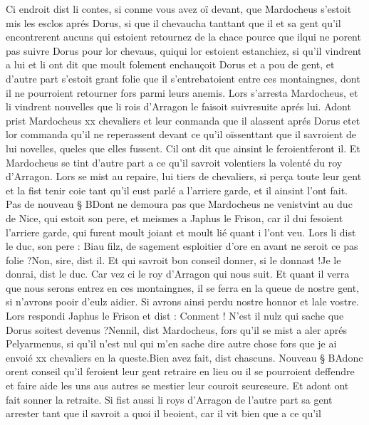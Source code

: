 \documentclass{article}
\begin{document}
\begin{pages}
\pstart Ci endroit dist li contes, si conme vous avez oï devant, que 
   Mardocheus s’estoit mis les esclos aprés Dorus, 
   si que il chevaucha tanttant que il et sa gent qu’il encontrerent aucuns 
   qui estoient retournez de la chace pource que ilqui ne porent pas suivre 
   Dorus pour lor chevaus, quiqui lor 
   estoient estanchiez, si qu’il vindrent a lui et li ont dit que 
   moult folement enchauçoit Dorus et a pou de gent, 
      et d’autre part s’estoit grant folie que il s’entrebatoient entre ces montaingnes, 
      dont il ne pourroient retourner fors parmi leurs anemis. 
   Lors s’arresta Mardocheus, et li vindrent nouvelles que 
   li rois d’Arragon 
   le faisoit suivresuite 
   aprés lui. Adont prist Mardocheus xx chevaliers et leur conmanda que 
   il alassent aprés Dorus 
      etet lor commanda qu’il ne reperassent 
      devant ce qu’il oïssenttant que il savroient de lui novelles, queles 
      que elles fussent. Cil ont dit que ainsint le 
         feroientferont il. Et 
   Mardocheus se tint d’autre part a ce 
   qu’il savroit volentiers la volenté du 
   roy d’Arragon. Lors se mist au repaire, lui 
   tiers de chevaliers, si perça toute leur gent et la fist tenir coie tant qu’il 
   eust parlé a l’arriere garde, et il ainsint l’ont fait. \pend
\pstart Pas de nouveau § BDont ne demoura pas que 
   Mardocheus ne 
   venistvint au 
   duc de Nice, qui estoit son pere, et meismes a 
   Japhus le Frison, car il dui fesoient l’arriere garde, qui furent moult 
   joiant et moult lié quant i l’ont veu. Lors li dist 
   le duc, son pere :
   Biau filz, de sagement esploitier d’ore en avant ne seroit 
      ce pas folie ?Non, sire, dist il. Et qui savroit bon conseil donner, si le donnast !Je le donrai, dist le duc. 
   Car vez ci le roy d’Arragon qui nous suit. 
   Et quant il verra que nous serons entrez en ces montaingnes, il se ferra en la queue de nostre gent, si n’avrons pooir d’eulz aidier. 
   Si avrons ainsi perdu nostre honnor et lale vostre.
   Lors respondi Japhus le Frison et dist :
   Conment ! N’est il nulz qui sache que Dorus 
      soitest devenus ?Nennil, dist Mardocheus, 
   fors qu’il se mist a aler aprés Pelyarmenus, si qu’il n’est nul qui m’en sache dire autre chose 
   fors que je ai envoié xx chevaliers en la queste.Bien avez fait, dist chascuns. 
   Nouveau § BAdonc orent conseil qu’il feroient leur gent retraire en lieu ou il se pourroient deffendre 
   et faire aide les uns aus autres se mestier leur couroit seureseure. Et adont
   ont fait sonner la retraite. Si fist aussi 
   li roys 
      d’Arragon de l’autre part sa gent arrester tant que il savroit a quoi il beoient, car il vit bien que a ce qu’il 

\end{pages}
\end{document}
